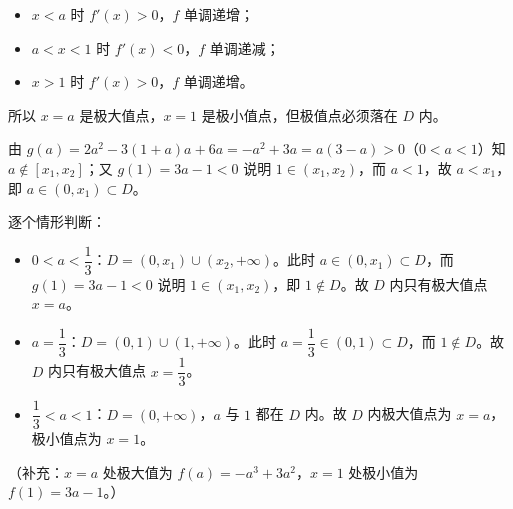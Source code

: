 \begin{answer}
\begin{itemize}
\item $x<a$ 时 $f'(x)>0$，$f$ 单调递增；
\item $a<x<1$ 时 $f'(x)<0$，$f$ 单调递减；
\item $x>1$ 时 $f'(x)>0$，$f$ 单调递增。
\end{itemize}

所以 $x=a$ 是极大值点，$x=1$ 是极小值点，但极值点必须落在 $D$ 内。

由 $g(a)=2a^2-3(1+a)a+6a=-a^2+3a=a(3-a)>0$（$0<a<1$）知 $a\notin[x_1,x_2]$；又 $g(1)=3a-1<0$ 说明 $1\in(x_1,x_2)$，而 $a<1$，故 $a<x_1$，即 $a\in(0,x_1)\subset D$。

逐个情形判断：

\begin{itemize}
\item $0<a<\dfrac13$：$D=(0,x_1)\cup(x_2,+\infty)$。此时 $a\in(0,x_1)\subset D$，而 $g(1)=3a-1<0$ 说明 $1\in(x_1,x_2)$，即 $1\notin D$。故 $D$ 内只有极大值点 $x=a$。
\item $a=\dfrac13$：$D=(0,1)\cup(1,+\infty)$。此时 $a=\dfrac13\in(0,1)\subset D$，而 $1\notin D$。故 $D$ 内只有极大值点 $x=\dfrac13$。
\item $\dfrac13<a<1$：$D=(0,+\infty)$，$a$ 与 $1$ 都在 $D$ 内。故 $D$ 内极大值点为 $x=a$，极小值点为 $x=1$。
\end{itemize}

（补充：$x=a$ 处极大值为 $f(a)=-a^3+3a^2$，$x=1$ 处极小值为 $f(1)=3a-1$。）



\end{answer}